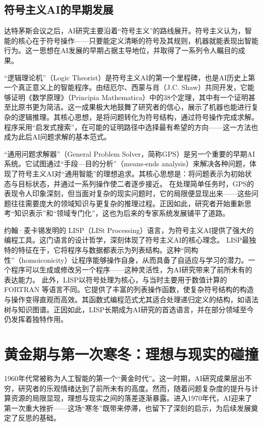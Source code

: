 \subsection{符号主义AI的早期发展}

达特茅斯会议之后，AI研究主要沿着“符号主义”的路线展开。符号主义认为，智能的核心在于符号操作——只要能定义清晰的符号及其规则，机器就能表现出智能行为。这一思想在AI发展的早期占据主导地位，并取得了一系列令人瞩目的成果。

“逻辑理论机”（Logic Theorist）是符号主义AI的第一个里程碑，也是AI历史上第一个真正意义上的智能程序。由纽厄尔、西蒙与肖（J.C. Shaw）共同开发，它能够证明《数学原理》（Principia Mathematica）中的38个定理，其中有一个证明甚至比原书更为简洁。这一成果极大地鼓舞了研究者的信心，展示了机器也能进行复杂的逻辑推理。其核心思想，是将问题转化为符号结构，通过符号操作完成求解。程序采用“启发式搜索”，在可能的证明路径中选择最有希望的方向——这一方法也成为此后AI问题求解的基本范式。

“通用问题求解器”（General Problem Solver，简称GPS）是另一个重要的早期AI系统。它试图通过“手段—目的分析”（means-ends analysis）来解决各种问题，体现了符号主义AI对“通用智能”的理想追求。其核心思想是：将问题表示为初始状态与目标状态，并通过一系列操作使二者逐步接近。  
在处理简单任务时，GPS的表现令人印象深刻，但当面对复杂的现实问题时，它的局限便显现出来——这些问题往往需要庞大的领域知识与更复杂的推理过程。正因如此，研究者开始重新思考“知识表示”和“领域专门化”，这也为后来的专家系统发展铺平了道路。

约翰·麦卡锡发明的 LISP（LISt Processing）语言，为符号主义AI提供了强大的编程工具。这门语言的设计哲学，深刻体现了符号主义AI的核心理念。  
LISP最独特的特征在于，它将程序与数据都表示为列表结构。这种“同构性”（homoiconicity）让程序能够操作自身，从而具备了自适应与学习的潜力。一个程序可以生成或修改另一个程序——这种灵活性，为AI研究带来了前所未有的表达能力。  
此外，LISP以符号处理为核心，与当时主要用于数值计算的 FORTRAN 等语言不同。它提供了丰富的列表操作函数，使复杂符号结构的构造与操作变得直观而高效。其函数式编程范式尤其适合处理递归定义的结构，如语法树与知识图谱。正因如此，LISP长期成为AI研究的首选语言，并在部分领域至今仍发挥着独特作用。

\section{黄金期与第一次寒冬：理想与现实的碰撞}

1960年代常被称为人工智能的第一个“黄金时代”。这一时期，AI研究成果层出不穷，研究者的乐观情绪达到了前所未有的高度。然而，随着问题复杂度的提升与计算资源的局限显现，理想与现实之间的落差逐渐暴露。进入1970年代，AI迎来了第一次重大挫折——这场“寒冬”既带来停滞，也留下了深刻的启示，为后续发展奠定了反思的基础。

